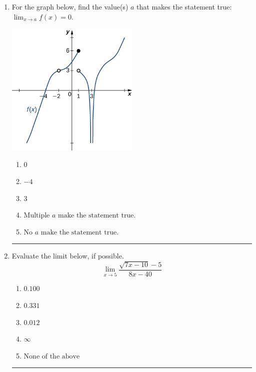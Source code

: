 \documentclass[14pt]{extbook}
\newcommand{\litem}[1]{\item#1\hspace*{-1cm}\rule{\textwidth}{0.4pt}}
\begin{document}
\begin{enumerate}
{\begin{enumerate}[label=\Alph*.]
\end{enumerate} }
\litem{
For the graph below, find the value(s) $a$ that makes the statement true: $ \displaystyle \lim_{x \rightarrow a} f(x) = 0$.
\begin{center}
    \includegraphics[width=0.5\textwidth]{../Figures/evaluateLimitGraphicallyCopyA.png}
\end{center}
\begin{enumerate}[label=\Alph*.]
\item \( 0 \)
\item \( -4 \)
\item \( 3 \)
\item \( \text{Multiple } a \text{ make the statement true}. \)
\item \( \text{No } a \text{ make the statement true}. \)

\end{enumerate} }
\litem{
Evaluate the limit below, if possible.\[ \lim_{x \rightarrow 5} \frac{\sqrt{7x - 10} - 5}{8x - 40} \]\begin{enumerate}[label=\Alph*.]
\item \( 0.100 \)
\item \( 0.331 \)
\item \( 0.012 \)
\item \( \infty \)
\item \( \text{None of the above} \)


\end{enumerate}}
\end{enumerate}
\end{document}
